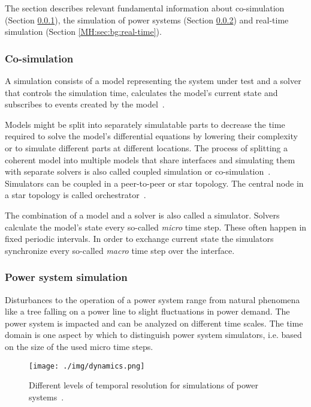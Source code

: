 \documentclass[a4paper]{atseminar}
\begin{document}
The section describes relevant fundamental information about co-simulation (Section \ref{MH:sec:bg:cosim}), the simulation of power systems (Section \ref{MH:sec:bg:power-sim}) and real-time simulation (Section \ref{MH:sec:bg:real-time}).

\subsubsection{Co-simulation}
\label{MH:sec:bg:cosim}

A simulation consists of a model representing the system under test and a solver that controls the simulation time, calculates the model's current state and subscribes to events created by the model~\cite{palensky2017}. 

Models might be split into separately simulatable parts to decrease the time required to solve the model's differential equations by lowering their complexity or to simulate different parts at different locations. The process of splitting a coherent model into multiple models that share interfaces and simulating them with separate solvers is also called coupled simulation or co-simulation~\cite{palensky2017}. Simulators can be coupled in a peer-to-peer or star topology. The central node in a star topology is called orchestrator~\cite{palensky2017}.

The combination of a model and a solver is also called a simulator. 
Solvers calculate the model's state every so-called \textit{micro} time step. These often happen in fixed periodic intervals. In order to exchange current state the simulators synchronize every so-called \textit{macro} time step over the interface.


\subsubsection{Power system simulation}
\label{MH:sec:bg:power-sim}

Disturbances to the operation of a power system range from natural phenomena like a tree falling on a power line to slight fluctuations in power demand. The power system is impacted and can be analyzed on different time scales. The time domain is one aspect by which to distinguish power system simulators, i.e. based on the size of the used micro time steps.

\begin{figure}[h]
 \centering
  \texttt{[image: ./img/dynamics.png]}
    \caption{Different levels of temporal resolution for simulations of power systems~\cite{sauer1998}.}
 \label{MH:fig:dynamics}
\end{figure}
\end{document}
